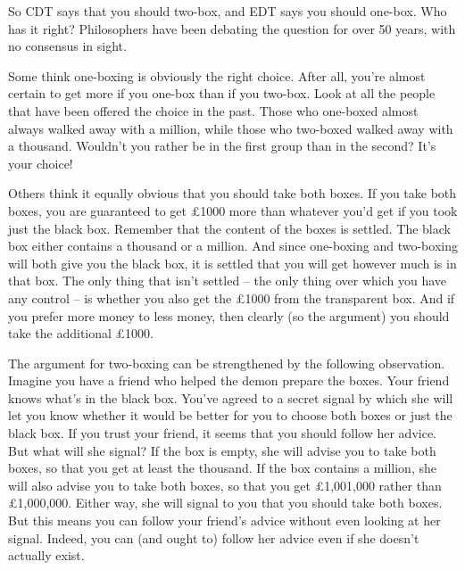 So CDT says that you should two-box, and EDT says you should
one-box. Who has it right? Philosophers have been debating the
question for over 50 years, with no consensus in sight.

Some think one-boxing is obviously the right choice. After all, you're
almost certain to get more if you one-box than if you two-box. Look at
all the people that have been offered the choice in the past. Those
who one-boxed almost always walked away with a million, while those
who two-boxed walked away with a thousand. Wouldn't you rather be in
the first group than in the second? It's your choice!


Others think it equally obvious that you should take both boxes. If
you take both boxes, you are guaranteed to get £1000 more than
whatever you'd get if you took just the black box. Remember that the
content of the boxes is settled. The black box either contains a
thousand or a million. And since one-boxing and two-boxing will both
give you the black box, it is settled that you will get however much
is in that box. The only thing that isn't settled -- the only thing
over which you have any control -- is whether you also get the £1000
from the transparent box. And if you prefer more money to less money,
then clearly (so the argument) you should take the additional £1000.

The argument for two-boxing can be strengthened by the following
observation. Imagine you have a friend who helped the demon prepare
the boxes. Your friend knows what's in the black box. You've agreed to
a secret signal by which she will let you know whether it would be
better for you to choose both boxes or just the black box. If you
trust your friend, it seems that you should follow her advice. But
what will she signal? If the box is empty, she will advise you to take
both boxes, so that you get at least the thousand. If the box contains
a million, she will also advise you to take both boxes, so that you
get £1,001,000 rather than £1,000,000. Either way, she will signal to
you that you should take both boxes. But this means you can follow
your friend's advice without even looking at her signal. Indeed, you
can (and ought to) follow her advice even if she doesn't actually
exist.

